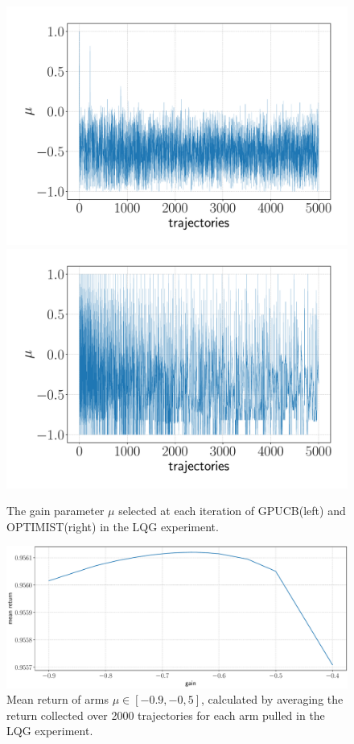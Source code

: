 \begin{figure}[t!] 
\includegraphics[width=.5\textwidth]{Images/LQG_GPUCB_mu.pdf}\hfill
\includegraphics[width=.5\textwidth]{Images/LQG_OPTIMIST_mu.pdf}\hfill
\caption{The gain parameter $\mu$ selected at each iteration of \gls{GPUCB}(left) and \gls{OPTIMIST}(right) in the \gls{LQG} experiment.}
\label{fig:LQGmu}
\end{figure}


\begin{figure}[t!]
\centering
\includegraphics[width=.75\textwidth,keepaspectratio]{Images/LQG_optimal_gain.pdf}
\caption{Mean return of arms $\mu\in[-0.9,-0,5]$, calculated by averaging the return collected over 2000 trajectories for each arm pulled in the \gls{LQG} experiment.}
\label{fig:LQGoptimalgain}
\end{figure}

